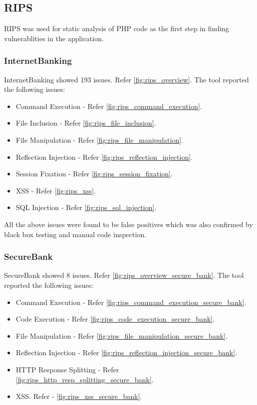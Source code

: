\subsection{RIPS}
RIPS was used for static analysis of PHP code as the first step in finding vulnerablities in the application.
\subsubsection{InternetBanking }
InternetBanking showed 193 issues. Refer \ref{fig:rips_overview}. The tool reported the following issues:
\begin{itemize}
    \item Command Execution - Refer \ref{fig:rips_command_execution}.
    \item File Inclusion - Refer \ref{fig:rips_file_inclusion}.
    \item File Manipulation - Refer \ref{fig:rips_file_manipulation}.
    \item Reflection Injection - Refer \ref{fig:rips_reflection_injection}.
    \item Session Fixation - Refer \ref{fig:rips_session_fixation}.
    \item XSS - Refer \ref{fig:rips_xss}.
    \item SQL Injection - Refer \ref{fig:rips_sql_injection}.
\end{itemize}
All the above issues were found to be false positives which was also confirmed by black box testing and manual code inspection.

\subsubsection{SecureBank}
SecureBank showed 8 issues. Refer \ref{fig:rips_overview_secure_bank}. The tool reported the following issues:
\begin{itemize}
    \item Command Execution - Refer \ref{fig:rips_command_execution_secure_bank}.
    \item Code Execution - Refer \ref{fig:rips_code_execution_secure_bank}.
    \item File Manipulation - Refer \ref{fig:rips_file_manipulation_secure_bank}.
    \item Reflection Injection - Refer \ref{fig:rips_reflection_injection_secure_bank}.
    \item HTTP Response Splitting - Refer \ref{fig:rips_http_resp_splitting_secure_bank}.
    \item XSS. Refer - \ref{fig:rips_xss_secure_bank}.
\end{itemize}

